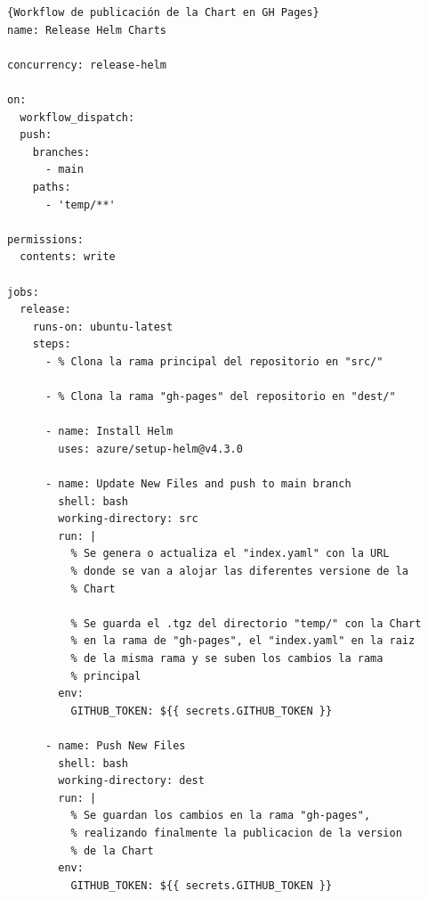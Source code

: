 \begin{lstlisting}[language=workflows,label=lst:ghpages]{Workflow de publicación de la Chart en GH Pages}
name: Release Helm Charts

concurrency: release-helm

on:
  workflow_dispatch:
  push:
    branches:
      - main
    paths:
      - 'temp/**'

permissions:
  contents: write

jobs:
  release:
    runs-on: ubuntu-latest
    steps:
      - % Clona la rama principal del repositorio en "src/"

      - % Clona la rama "gh-pages" del repositorio en "dest/"

      - name: Install Helm
        uses: azure/setup-helm@v4.3.0

      - name: Update New Files and push to main branch
        shell: bash
        working-directory: src
        run: |
          % Se genera o actualiza el "index.yaml" con la URL
          % donde se van a alojar las diferentes versione de la
          % Chart

          % Se guarda el .tgz del directorio "temp/" con la Chart
          % en la rama de "gh-pages", el "index.yaml" en la raiz
          % de la misma rama y se suben los cambios la rama
          % principal
        env:
          GITHUB_TOKEN: ${{ secrets.GITHUB_TOKEN }}

      - name: Push New Files
        shell: bash
        working-directory: dest
        run: |
          % Se guardan los cambios en la rama "gh-pages",
          % realizando finalmente la publicacion de la version
          % de la Chart
        env:
          GITHUB_TOKEN: ${{ secrets.GITHUB_TOKEN }}
\end{lstlisting}

